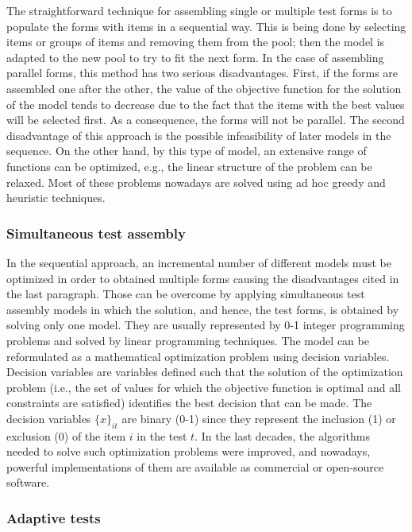The straightforward technique for assembling single or multiple test forms is to populate the forms with items in a sequential way. This is being done by selecting items or groups of items and removing them from the pool; then the model is adapted to the new pool to try to fit the next form. In the case of assembling parallel forms, this method has two serious disadvantages. First, if the forms are assembled one after the other, the value of the objective function for the solution of the model tends to decrease due to the fact that the items with the best values will be selected first. As a consequence, the forms will not be parallel. The second disadvantage of
this approach is the possible infeasibility of later models in the sequence. On the other hand, by this type of model, an extensive range of functions can be optimized, e.g., the linear structure of the problem can be relaxed. Most of these problems nowadays are solved using ad hoc greedy and heuristic techniques.

\subsubsection{Simultaneous test assembly}

In the sequential approach, an incremental number of different models must be optimized in order to obtained multiple forms causing the disadvantages cited in the last paragraph. Those can be overcome by applying simultaneous test assembly models in which the solution, and hence, the test forms, is obtained by solving only one model. They are usually represented by 0-1 integer programming problems and solved by linear programming techniques. The model can be reformulated as a mathematical optimization problem using decision variables. Decision variables are variables defined such that the solution of the optimization problem (i.e., the set of values for which the objective function is optimal and all constraints are satisfied) identifies the best decision that can be made. The decision variables $\{x\}_{it}$ are binary (0-1) since they represent the inclusion (1) or exclusion (0) of the item $i$ in the test $t$. In the last decades, the algorithms needed to solve such optimization problems were improved, and nowadays, powerful implementations of them are available as commercial or open-source software.

\subsubsection{Adaptive tests}

